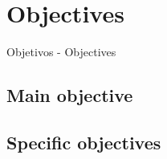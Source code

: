 \chapter{Objectives} %
\label{chap:objectives}


Objetivos - Objectives

\section{Main objective}




\section{Specific objectives}




